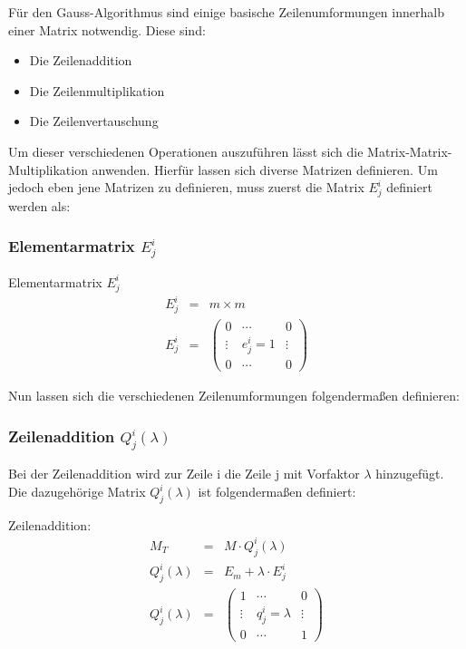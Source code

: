 
Für den Gauss-Algorithmus sind einige basische Zeilenumformungen innerhalb einer Matrix notwendig. Diese sind:

\begin{itemize}
\item Die Zeilenaddition
\item Die Zeilenmultiplikation
\item Die Zeilenvertauschung
\end{itemize}

Um dieser verschiedenen Operationen auszuführen lässt sich die Matrix-Matrix-Multiplikation anwenden. Hierfür lassen sich diverse Matrizen definieren.
Um jedoch eben jene Matrizen zu definieren, muss zuerst die Matrix $E^i_j$ definiert werden als:

\subsubsection{Elementarmatrix $E^i_j$}
\begin{Def} Elementarmatrix $E^i_j$
\begin{eqnarray}
	E^i_j &=& m \times m \\
 	E^i_j &=& 
	 	\begin{pmatrix}
	 	0 & \cdots & 0 \\
	 	\vdots & e^i_j = 1 & \vdots \\
	 	0 & \cdots & 0 
 	\end{pmatrix}
\end{eqnarray}
\end{Def}

\raggedright Nun lassen sich die verschiedenen Zeilenumformungen folgendermaßen definieren:

\subsubsection{Zeilenaddition $Q^i_j(\lambda)$}
Bei der Zeilenaddition wird zur Zeile i die Zeile j mit Vorfaktor $\lambda$ hinzugefügt.
Die dazugehörige Matrix $Q^i_j(\lambda)$ ist folgendermaßen definiert:
\begin{Def} Zeilenaddition:
\begin{eqnarray}
	M_T &=& M \cdot Q^i_j(\lambda) \\
	Q^i_j(\lambda) & = & E_m + \lambda \cdot E^i_j \\
	Q^i_j(\lambda) & = & 
	\begin{pmatrix}
	1 & \cdots & 0 \\ 
	\vdots &  q^i_j = \lambda & \vdots \\  
	0 & \cdots & 1
	\end{pmatrix} 
\end{eqnarray}
\end{Def}

